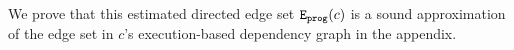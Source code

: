 We prove that this estimated directed edge set $\mathtt{{E_{prog}}}(c)$ is a sound approximation of the 
edge set in $c$'s execution-based dependency graph 
in the appendix.
